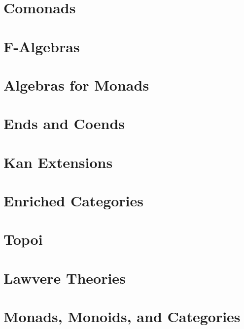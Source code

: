 \chapter{Comonads}\label{comonads}


\chapter{F-Algebras}\label{f-algebras}


\chapter{Algebras for Monads}\label{algebras-for-monads}


\chapter{Ends and Coends}\label{ends-and-coends}


\chapter{Kan Extensions}\label{kan-extensions}


\chapter{Enriched Categories}\label{enriched-categories}


\chapter{Topoi}\label{topoi}


\chapter{Lawvere Theories}\label{lawvere-theories}


\chapter{Monads, Monoids, and Categories}\label{monads-monoids-categories}


